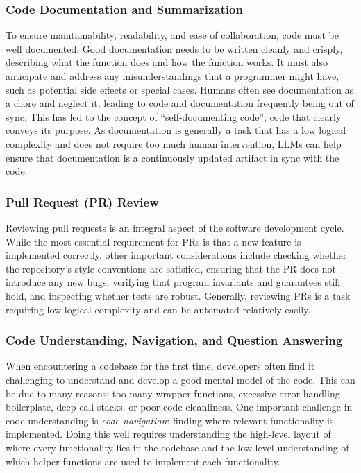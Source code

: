 \subsubsection{Code Documentation and Summarization}

To ensure maintainability, readability, and ease of collaboration, code must be well documented. Good documentation needs to be written cleanly and crisply, describing what the function does and how the function works. It must also anticipate and address any misunderstandings that a programmer might have, such as potential side effects or special cases. Humans often see documentation as a chore and neglect it, leading to code and documentation frequently being out of sync. This has led to the concept of ``self-documenting code'', code that clearly conveys its purpose. As documentation is generally a task that has a low logical complexity and does not require too much human intervention, LLMs can help ensure that documentation is a continuously updated artifact in sync with the code. 

\subsubsection{Pull Request (PR) Review}
Reviewing pull requests is an integral aspect of the software development cycle. While the most essential requirement for PRs is that a new feature is implemented correctly, other important considerations include checking whether the repository's style conventions are satisfied, ensuring that the PR does not introduce any new bugs, verifying that program invariants and guarantees still hold, and inspecting whether tests are robust. Generally, reviewing PRs is a task requiring low logical complexity and can be automated relatively easily.

\subsubsection{Code Understanding, Navigation, and Question Answering}

When encountering a codebase for the first time, developers often find it challenging to understand and develop a good mental model of the code. This can be due to many reasons: too many wrapper functions, excessive error-handling boilerplate, deep call stacks, or poor code cleanliness. One important challenge in code understanding is \textit{code navigation}: finding where relevant functionality is implemented. Doing this well requires understanding the high-level layout of where every functionality lies in the codebase and the low-level understanding of which helper functions are used to implement each functionality. 

